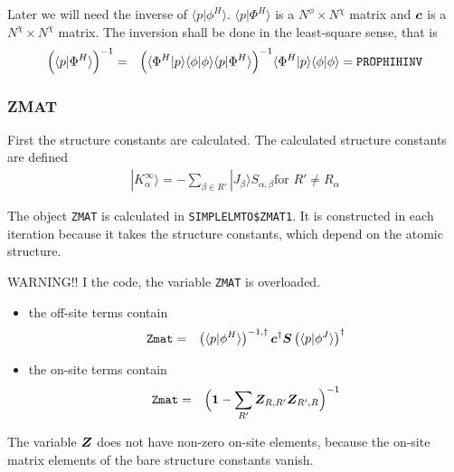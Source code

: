 \documentclass[11pt,a4paper]{report}
\begin{document}
Later we will need the inverse of $\langle{p}|\phi^H\rangle$.
$\langle{p}|\Phi^H\rangle$ is a $N^\phi\times N^\chi$ matrix and
$\bm{c}$ is a $N^\chi\times N^\chi$ matrix.  The inversion shall be
done in the least-square sense, that is
\begin{eqnarray}
\Bigl(\langle{p}|\Phi^H\rangle\Bigr)^{-1}
&=&
\Bigl(\langle\Phi^H|p\rangle
\langle\phi|\phi\rangle
\langle{p}|\Phi^H\rangle\Bigr)^{-1}
\langle\Phi^H|p\rangle\langle\phi|\phi\rangle=\verb|PROPHIHINV|
\end{eqnarray}


\subsubsection{ZMAT}
First the structure constants are calculated. The calculated structure
constants are defined
\begin{eqnarray}
|K_\alpha^\infty\rangle=-\sum_{\beta\in R'} |J_\beta\rangle S_{\alpha,\beta}
\text{for $R'\neq R_\alpha$}
\end{eqnarray}


The object \verb|ZMAT| is calculated in \verb|SIMPLELMTO$ZMAT1|.  It
is constructed in each iteration because it takes the structure
constants, which depend on the atomic structure.

WARNING!! I the code, the variable \verb|ZMAT| is overloaded. 
\begin{itemize}
\item the off-site terms contain 
\begin{eqnarray}
\verb|Zmat|&=&\left(\langle{p}|\phi^H\rangle\right)^{-1,\dagger}
\mat{c}^\dagger \mat{S} 
\left(\langle{p}|\phi^J\rangle\right)^{\dagger}
\end{eqnarray}
\item the on-site terms contain
\begin{eqnarray}
\verb|Zmat|&=&\Bigl(\mat{1}-\sum_{R'} \mat{Z}_{R,R'}\mat{Z}_{R',R}\Bigr)^{-1}
\end{eqnarray}
\end{itemize}
The variable $\bm{Z}$ does not have non-zero on-site elements,
because the on-site matrix elements of the bare structure constants
vanish.
\end{document}
